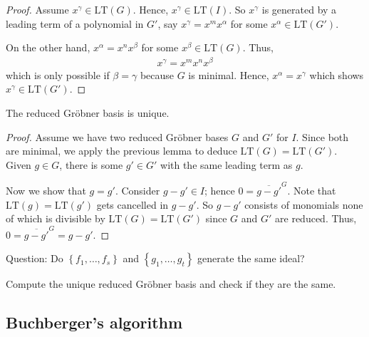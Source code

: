\documentclass[a4paper, 11pt]{article}
\begin{document}
\begin{proof}
  Assume \( x^\gamma \in \mathrm{LT}(G) \). Hence, \( x^\gamma \in \mathrm{LT}(I) \). So \( x^\gamma \) is generated by a leading term of a polynomial in \( G' \), say \( x^\gamma = x^{m} x^\alpha \) for some \( x^\alpha \in \mathrm{LT}(G') \).

  On the other hand, \( x^\alpha = x^n x^\beta\) for some \( x^\beta \in \mathrm{LT}(G) \). Thus, 
  \begin{align*}
    x^\gamma = x^m x^n x^\beta
  \end{align*}
  which is only possible if \( \beta = \gamma \) because \( G \) is minimal. Hence, \( x^\alpha = x^\gamma \) which shows \( x^\gamma \in \mathrm{LT}(G') \).
\end{proof}

\begin{prop}
  The reduced Gröbner basis is unique.
\end{prop}
\begin{proof}
  Assume we have two reduced Gröbner bases \( G \) and \( G' \) for \( I \). Since both are minimal, we apply the previous lemma to deduce \( \mathrm{LT}(G) = \mathrm{LT}(G') \). Given \( g \in G \), there is some \( g' \in G' \) with the same leading term as \( g \).

  Now we show that \( g = g' \). Consider \( g - g' \in I \); hence \( 0 = \overline{g - g'}^{G}  \). Note that \( \mathrm{LT}(g) = \mathrm{LT}(g') \) gets cancelled in \( g - g' \). So \( g - g' \) consists of monomials none of which is divisible by \( \mathrm{LT}(G) = \mathrm{LT}(G') \) since \( G \) and \( G' \) are reduced. Thus, \( 0 = \overline{g - g'}^{G} = g - g' \).
\end{proof}


\begin{remark}
  Question: Do \( \left\{ f_1, \dots, f_s \right\} \) and \( \left\{ g_1, \dots, g_t \right\} \) generate the same ideal?

  Compute the unique reduced Gröbner basis and check if they are the same.
\end{remark}


\subsection{Buchberger's algorithm}

\end{document}
